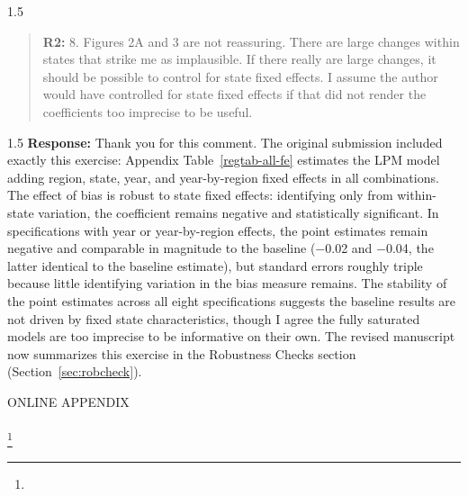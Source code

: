 \documentclass[12pt,english]{article}
\newcommand{\rrxspc}{1.5}
\begin{document}
\begin{refsection}
    \begin{spacing}{\rrxspc}
            \begin{quotation}
                \textbf{R2: } 8. Figures 2A and 3 are not reassuring. There are large changes within states that strike me as implausible. If there really are large changes, it should be possible to control for state fixed effects. I assume the author would have controlled for state fixed effects if that did not render the coefficients too imprecise to be useful.
            \end{quotation}
    \end{spacing}
\begin{spacing}{\rrxspc}
    \textbf{Response:} Thank you for this comment. The original submission included exactly this exercise: Appendix Table~\ref{regtab-all-fe} estimates the LPM model adding region, state, year, and year-by-region fixed effects in all combinations. The effect of bias is robust to state fixed effects: identifying only from within-state variation, the coefficient remains negative and statistically significant. In specifications with year or year-by-region effects, the point estimates remain negative and comparable in magnitude to the baseline ($-$0.02 and $-$0.04, the latter identical to the baseline estimate), but standard errors roughly triple because little identifying variation in the bias measure remains. The stability of the point estimates across all eight specifications suggests the baseline results are not driven by fixed state characteristics, though I agree the fully saturated models are too imprecise to be informative on their own. The revised manuscript now summarizes this exercise in the Robustness Checks section (Section~\ref{sec:robcheck}).
\end{spacing}

    \clearpage
    \pagebreak

    \end{refsection}

\clearpage
\pagebreak

\begin{refsection}
\setcounter{section}{0}
\renewcommand{\thesection}{\Alph{section}}
\renewcommand{\thesubsection}{\Alph{section}.\arabic{subsection}}
\renewcommand{\thesubsubsection}{\Alph{section}.\arabic{subsection}.\arabic{subsubsection}}

\renewcommand*{\thefootnote}{\fnsymbol{footnote}}
\begingroup
\doublespacing
\centering
\Large ONLINE APPENDIX \\[1.5em]
\LARGE \PAPERTITLE \\[0.75em]
\large
\AUTHORHADAH\footnote[1]{\AUTHORHADAHINFO}\\[1.0em]
\endgroup
\clearpage



\newpage
\pagebreak

\begingroup
{}
\setlength\bibitemsep{0pt}
\printbibliography[title=References for Online Appendix]
\endgroup
\pagebreak
\end{refsection}
\end{document}
